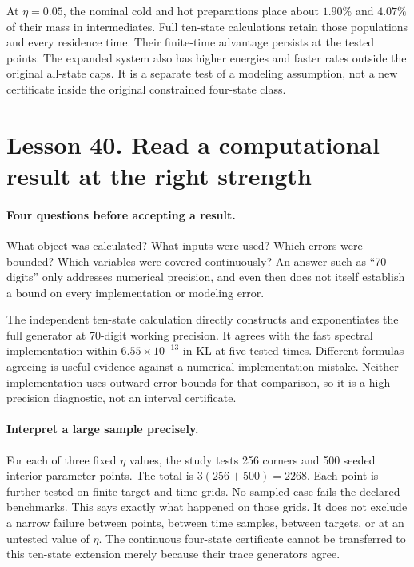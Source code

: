 \documentclass[11pt]{article}
\begin{document}
At $\eta=0.05$, the nominal cold and hot preparations place about $1.90\%$
and $4.07\%$ of their mass in intermediates. Full ten-state calculations
retain those populations and every residence time. Their finite-time
advantage persists at the tested points. The expanded system also has
higher energies and faster rates outside the original all-state caps.
It is a separate test of a modeling assumption, not a new certificate
inside the original constrained four-state class.

\section*{Lesson 40. Read a computational result at the right strength}
\paragraph{Four questions before accepting a result.}
What object was calculated? What inputs were used? Which errors were bounded?
Which variables were covered continuously? An answer such as ``70 digits''
only addresses numerical precision, and even then does not itself establish
a bound on every implementation or modeling error.

The independent ten-state calculation directly constructs and exponentiates
the full generator at 70-digit working precision. It agrees with the fast
spectral implementation within $6.55\times10^{-13}$ in KL at five tested
times. Different formulas agreeing is useful evidence against a numerical
implementation mistake. Neither implementation uses outward error bounds
for that comparison, so it is a high-precision diagnostic, not an interval
certificate.

\paragraph{Interpret a large sample precisely.}
For each of three fixed $\eta$ values, the study tests 256 corners and 500
seeded interior parameter points. The total is $3(256+500)=2268$.
Each point is further tested on finite target and time grids. No sampled
case fails the declared benchmarks. This says exactly what happened on
those grids. It does not exclude a narrow failure between points, between
time samples, between targets, or at an untested value of $\eta$.
The continuous four-state certificate cannot be transferred to this
ten-state extension merely because their trace generators agree.
\end{document}
